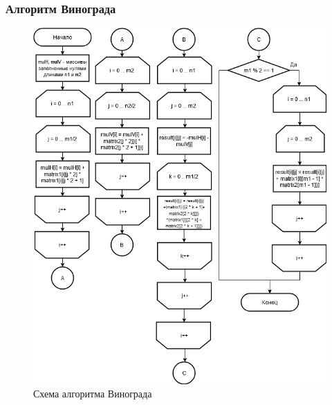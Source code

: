 \documentclass[12pt,a4paper]{article}
\begin{document}
\subsubsection{Алгоритм Винограда}
\begin{figure}[!htbp]
\centering
\includegraphics[scale=0.7]{Grape)}
\caption{Схема алгоритма Винограда}
\label{fig:mpr}
\end{figure}
\clearpage
\end{document}
